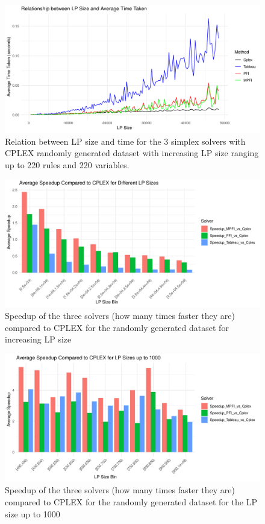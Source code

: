 \begin{figure}[p]
    \includegraphics[width=0.8\paperwidth, height=\paperheight, keepaspectratio]{figures/cplex_vs_all_random_large.pdf}
    \caption{Relation between LP size and time for the 3 simplex solvers with CPLEX randomly generated
        dataset with increasing LP size ranging up to 220 rules and 220 variables.}
    \label{cplex_vs_all_random_large}
\end{figure}

\begin{figure}[!htb]
    \centering
    \includegraphics[width=\linewidth]{figures/speedup_vs_cplex_random_200.pdf}
    \caption{Speedup of the three solvers (how many times faster they are) compared to CPLEX for
        the randomly generated dataset for increasing LP size}
    \label{fig:speedup_cplex_random.pdf}
\end{figure}

\begin{figure}[!htb]
    \centering
    \includegraphics[width=\linewidth]{figures/speedup_cplex_less_1000.pdf}
    \caption{Speedup of the three solvers (how many times faster they are) compared to CPLEX for
        the randomly generated dataset for the LP size up to 1000}
    \label{fig:speedup_cplex_less_1000.pdf}
\end{figure}

